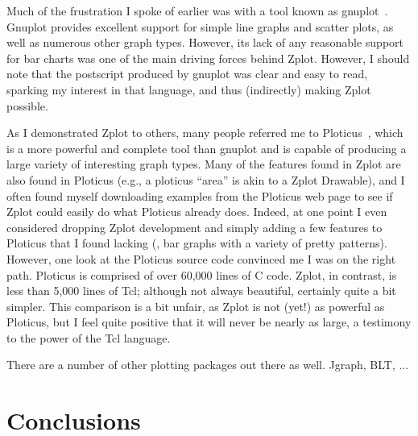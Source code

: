 Much of the frustration I spoke of earlier was with a tool known as
gnuplot~\cite{gnuplot}. Gnuplot provides excellent support for simple line
graphs and scatter plots, as well as numerous other graph types. However, its
lack of any reasonable support for bar charts was one of the main driving
forces behind Zplot. However, I should note that the postscript produced by
gnuplot was clear and easy to read, sparking my interest in that language, and
thus (indirectly) making Zplot possible.

As I demonstrated Zplot to others, many people referred me to
Ploticus~\cite{Ploticus}, which is a more powerful and complete tool than
gnuplot and is capable of producing a large variety of interesting graph
types. Many of the features found in Zplot are also found in Ploticus (e.g., a
ploticus ``area'' is akin to a Zplot Drawable), and I often found myself
downloading examples from the Ploticus web page to see if Zplot could easily
do what Ploticus already does. Indeed, at one point I even considered dropping
Zplot development and simply adding a few features to Ploticus that I found
lacking (\eg, bar graphs with a variety of pretty patterns). However, one look
at the Ploticus source code convinced me I was on the right path. Ploticus is
comprised of over 60,000 lines of C code. Zplot, in contrast, is less than
5,000 lines of Tcl; although not always beautiful, certainly quite a bit
simpler. This comparison is a bit unfair, as Zplot is not (yet!) as powerful
as Ploticus, but I feel quite positive that it will never be nearly as large,
a testimony to the power of the Tcl language.

There are a number of other plotting packages out there as well. Jgraph, BLT, ...


\section{Conclusions}
















